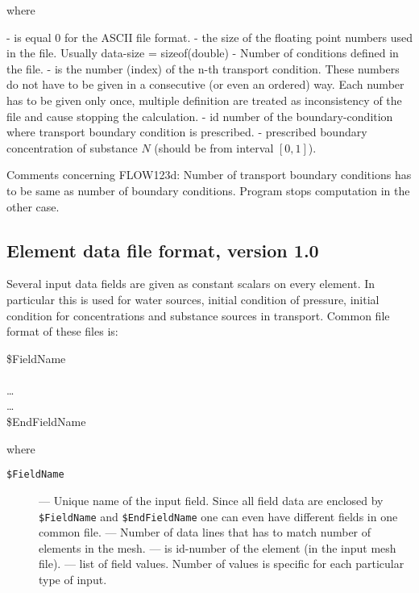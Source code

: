 where
\begin{description}
 - is equal 0 for the ASCII file format.
 - the size of the floating point numbers used in the file. Usually data-size = sizeof(double)
 - Number of conditions defined in the file.
 - is the number (index) of the n-th transport condition. These numbers do not have to be given in a consecutive (or even an ordered) way. Each number has to be given only once, multiple definition are treated as inconsistency of the file and cause stopping the calculation.
 - id number of the boundary-condition where transport boundary condition is prescribed.
 - prescribed boundary concentration of substance $N$ (should be from interval $[0,1]$).
\end{description}

Comments concerning FLOW123d:
        Number of transport boundary conditions has to be same as number of boundary conditions. Program stops computation in the other case.

\subsection{Element data file format, version 1.0}
\label{element_data_file}

Several input data fields are given as constant scalars on every element. In particular this is used for water sources, initial condition of pressure,
initial condition for concentrations and substance sources in transport. Common file format of these files is:

\begin{fileformat}
\$FieldName\\
  \\
     \dots\\
  \dots\\ 
\$EndFieldName\\
\end{fileformat}
where
\begin{description}
 \item[{\tt \$FieldName}] --- Unique name of the input field. Since all field data are enclosed by \verb'$FieldName' and \verb'$EndFieldName' one can even have different fields in one common file.
  --- Number of data lines that has to match number of elements in the mesh.
  --- is id-number of the element (in the input mesh file).
  --- list of field values. Number of values is specific for each particular type of input.
\end{description}

